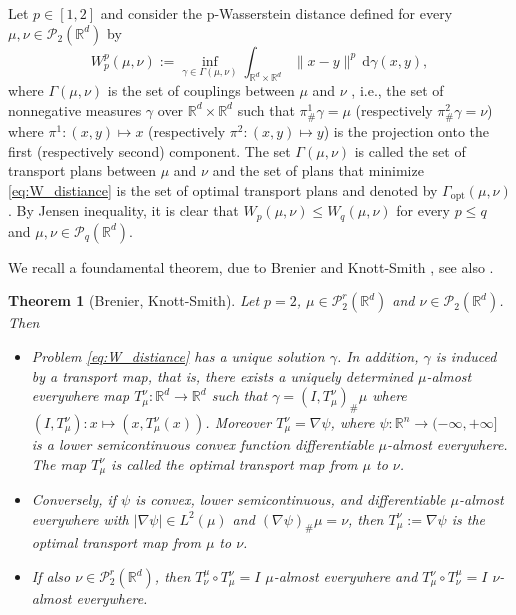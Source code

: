 \documentclass[11pt]{article}
\newtheorem{theorem}{Theorem}[section]
\newcommand{\cP}{\mathcal{P}}
\newcommand{\R}{\mathbb{R}}
\numberwithin{equation}{section}
\begin{document}
Let $p\in [1,2]$ and consider the p-Wasserstein distance defined for every $\mu, \nu \in \mathcal{P}_2(\mathbb{R}^d)$ by
\begin{equation}\label{eq:W_distiance}
	W_p^p(\mu, \nu) := \inf_{\gamma \in \Gamma(\mu, \nu)} \int_{\mathbb{R}^d \times \mathbb{R}^d} \|x - y\|^p \, \mathrm{d}\gamma(x, y),
\end{equation}
where $\Gamma(\mu, \nu)$ is the set of couplings between $\mu$ and $\nu$ \cite{Villani08}, i.e., the set of nonnegative measures $\gamma$ over $\mathbb{R}^d \times \mathbb{R}^d$ such that $ \pi^1_{\#} \gamma = \mu$ (respectively $ \pi^2_{\#} \gamma = \nu$) where $ \pi^1: (x, y) \mapsto x$ (respectively $ \pi^2: (x, y) \mapsto y$) is the projection onto the first (respectively second) component. The set $\Gamma(\mu,\nu)$ is called the set of transport plans between $\mu$ and $\nu$ and the set of plans that minimize \eqref{eq:W_distiance} is the set of optimal transport plans and denoted by $\Gamma_{\text{opt}}(\mu,\nu)$. By Jensen inequality, it is clear that $W_p(\mu,\nu)\leq W_q(\mu,\nu)$ for every $p\leq q$ and $\mu,\nu \in \cP_q(\R^d)$.

We recall a foundamental theorem, due to Brenier \cite{Brenier91} and Knott-Smith \cite{KnottSmith1984}, see also \cite[Proposition 5.2]{ABS2024}.

\begin{theorem}[Brenier, Knott-Smith]\label{thm:brenier}
	Let $p=2$, $\mu \in \mathcal{P}_2^r(\mathbb{R}^d)$ and $\nu \in \mathcal{P}_2(\mathbb{R}^d)$. Then
	\begin{itemize}
		\item[(i)] Problem \eqref{eq:W_distiance} has a unique solution $\gamma$. In addition, $\gamma$ is induced by a transport map, that is, there exists a uniquely determined $\mu$-almost everywhere map $T_{\mu}^{\nu}: \mathbb{R}^d \rightarrow \mathbb{R}^d$ such that $\gamma = (I, T_{\mu}^{\nu})_{\#} \mu$ where $(I, T_{\mu}^{\nu}): x \mapsto (x, T_{\mu}^{\nu}(x))$. Moreover $T_{\mu}^{\nu} = \nabla \psi$, where $\psi: \mathbb{R}^n \to (-\infty, +\infty]$ is a lower semicontinuous convex function differentiable $\mu$-almost everywhere. The map $T_{\mu}^{\nu}$ is called the optimal transport map from $\mu$ to $\nu$. 
		
		\item[(ii)] Conversely, if $\psi$ is convex, lower semicontinuous, and differentiable $\mu$-almost everywhere with $|\nabla \psi| \in L^2(\mu)$ and $(\nabla \psi)_{\#} \mu=\nu$, then $T_{\mu}^\nu := \nabla \psi$ is the optimal transport map from $\mu$ to $\nu$.
		
		\item[(iii)] If also $\nu \in \mathcal{P}_2^r(\mathbb{R}^d)$, then $ T_{\nu}^{\mu} \circ T_{\mu}^{\nu} = I$ $\mu$-almost everywhere and $ T_{\mu}^{\nu} \circ T_{\nu}^{\mu} = I$ $\nu$-almost everywhere.
	\end{itemize}
\end{theorem} 	
\end{document}
